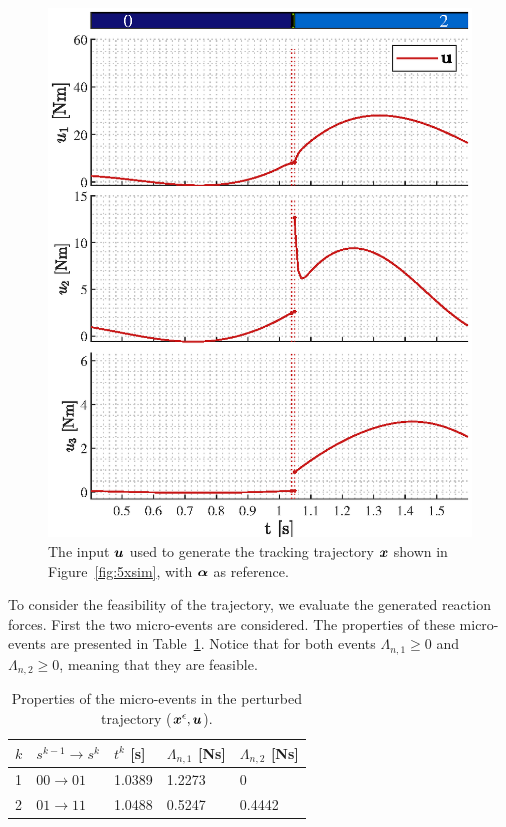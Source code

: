\documentclass[../DC2019003Bouma.tex]{subfiles}
\begin{document}
\begin{figure}[bt!]
\begin{minipage}[c]{.48\textwidth}
\includegraphics[width=\textwidth]{u.eps}
\end{minipage}
\caption{The input ${\boldsymbol{u}}$ used to generate the tracking trajectory ${\boldsymbol{x}}$ shown in Figure~\ref{fig:5xsim}, with $\boldsymbol{\alpha}$ as reference.}\label{fig:5usim}
\end{figure}

To consider the feasibility of the trajectory, we evaluate the generated reaction forces. First the two micro-events are considered. The properties of these micro-events are presented in Table~\ref{tab:pertevent}. Notice that for both events $\Lambda_{n,1}\geq 0$ and $\Lambda_{n,2}\geq 0$, meaning that they are feasible.
\begin{table}[h!]
\centering
\caption{Properties of the micro-events in the perturbed trajectory (${\boldsymbol{x}}^\epsilon,{\boldsymbol{u}}$).}\label{tab:pertevent}
\begin{tabular}{l|l|l|l|l}
$k$ & $s^{k-1}\rightarrow s^k$ & $t^k$ {[}s{]} & $\Lambda_{n,1}$ {[}Ns{]} & $\Lambda_{n,2}$ {[}Ns{]} \\ \hline
1   & $00\rightarrow 01$       & 1.0389        & 1.2273                   & 0                        \\
2   & $01\rightarrow 11$       & 1.0488        & 0.5247                   & 0.4442                  
\end{tabular}
\end{table}
\end{document}
